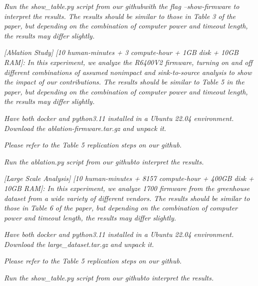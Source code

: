 \begin{compactdesc}
\begin{asparadesc}
        \item[Results:] \textit{Run the show\_table.py script from our github\footnotemark[1] with the flag \textit{--show-firmware} to interpret the results.
        The results should be similar to those in Table 3 of the paper, but depending on the combination of computer power and timeout length, the results may differ slightly.}
    \end{asparadesc}

    \item[(E3):] \textit{[Ablation Study] [10 human-minutes + 3 compute-hour + 1GB disk + 10GB RAM]: 
    In this experiment, we analyze the R6400V2 firmware, turning on and off different combinations of assumed nonimpact and sink-to-source analysis to show the impact of our contributions.
    The results should be similar to Table 5 in the paper, but depending on the combination of computer power and timeout length, the results may differ slightly.}

    \begin{asparadesc}
        \item[Preparation:] \textit{Have both docker and python3.11 installed in a Ubuntu 22.04 environment.
        Download the ablation-firmware.tar.gz and unpack it.}

        \item[How to:]  \textit{Please refer to the Table 5 replication steps on our github\footnotemark[1].}

        \item[Results:] \textit{Run the ablation.py script from our github\footnotemark[1] to interpret the results.}
    \end{asparadesc}

    \item[(E4):] \textit{[Large Scale Analysis] [10 human-minutes + 8157 compute-hour + 400GB disk + 10GB RAM]: 
    In this experiment, we analyze 1700 firmware from the greenhouse dataset from a wide variety of different vendors.
    The results should be similar to those in Table 6 of the paper, but depending on the combination of computer power and timeout length, the results may differ slightly.}

    \begin{asparadesc}
        \item[Preparation:] \textit{Have both docker and python3.11 installed in a Ubuntu 22.04 environment.
        Download the large\_dataset.tar.gz and unpack it.}

        \item[How to:]  \textit{Please refer to the Table 5 replication steps on our github\footnotemark[1].}

        \item[Results:] \textit{Run the show\_table.py script from our github\footnotemark[1] to interpret the results.}
    \end{asparadesc}


\end{compactdesc}


